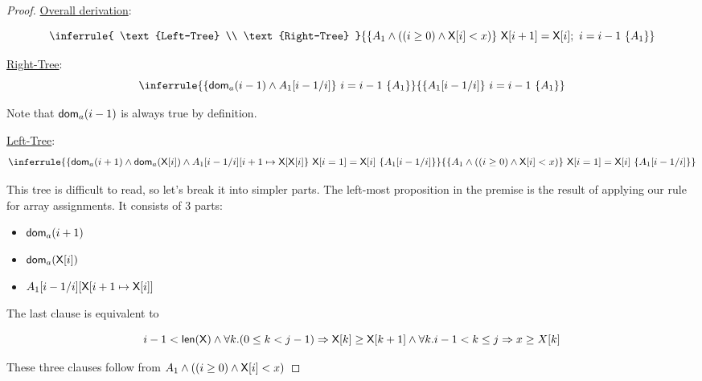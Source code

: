 \begin{enumerate}[(a)]
\begin{enumerate}[i.]
\begin{proof}
        \newcommand{\rightPremise}{
            \{ \dom_a(i - 1) \wedge A_1[i - 1/ i] \}
            ~i = i - 1~
            \{ A_1 \}
        }

        \newcommand{\rightBase}{
            \{ A_1[i - 1/ i] \}
            ~i = i - 1~
            \{ A_1 \}
        }
        \newcommand{\treeBase}{
            \{ A_1 \wedge ((i \geq 0) \wedge {\sf X}[i] < x) \}
            ~\X[i + 1] = \X[i];~i = i - 1~
            \{ A_1 \}
        }

        \underline{Overall derivation}:

        $$ \inferrule{
                \text{Left-Tree}
                \\
                \text{Right-Tree}
            }{\treeBase}
        $$

        \underline{Right-Tree}: \\
        $$ \inferrule{\rightPremise}{\rightBase} $$

        Note that ${\sf dom}_a(i - 1)$ is always true by definition.

        \underline{Left-Tree}:  \\
        $$ \inferrule{\leftPremise}{\leftBase} $$

        This tree is difficult to read, so let's break it into simpler parts.
        The left-most proposition in the premise is the result of applying
        our rule for array assignments. It consists of 3 parts:

        \begin{itemize}
        \item ${\sf dom}_a(i + 1)$
        \item ${\sf dom}_a({\sf X}[i])$
        \item $A_1[i - 1 / i][\textsf{X}[i + 1 \mapsto \textsf{X}[i]]$
        \end{itemize}

        The last clause is equivalent to

        $$
        i - 1 < {\sf len(X)}
        \wedge \forall k. (0 \leq k < j - 1) \Rightarrow \textsf{X}[k] \geq \textsf{X}[k + 1]
        \wedge \forall k . i - 1 < k \leq j \Rightarrow  x \geq X[k]
        $$

        These three clauses follow from $ A_1 \wedge ((i \geq 0) \wedge {\sf X}[i] < x) $


\end{proof}
\end{enumerate}
\end{enumerate}
